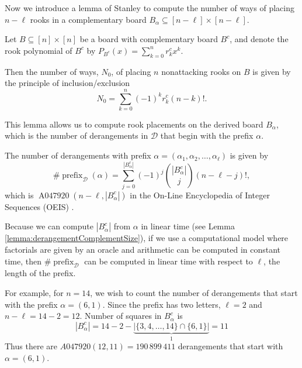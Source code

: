 Now we introduce a lemma of Stanley \cite{Stanley2011EC1} to compute the number
of ways of placing $n - \ell$ rooks in a complementary board
$B_\alpha \subseteq [n - \ell] \times [n - \ell]$.

\begin{lemma}
  Let $B \subseteq [n] \times [n]$ be a board with complementary board $B^c$,
  and denote the rook polynomial of $B^c$ by
  $P_{B^c}(x) = \sum_{k=0}^n r^c_k x^k$.

  Then the number of ways, $N_0$, of placing $n$ nonattacking rooks on $B$
  is given by the principle of inclusion/exclusion
  \[
    N_0 = \sum_{k=0}^n (-1)^k r^c_k (n-k)!.
  \]
  \label{lemma:CountsFromComplementaryPolynomials}
\end{lemma}

This lemma allows us to compute rook placements on the derived board $B_\alpha$,
which is the number of derangements in $\mathcal{D}$ that begin with the prefix
$\alpha$.
\begin{corollary}
  The number of derangements with prefix
  $\alpha = (\alpha_1, \alpha_2, \dots, \alpha_\ell)$
  is given by \[
    \#\operatorname{prefix}_\mathcal{D}(\alpha)
    = \sum_{j=0}^{|B_\alpha^c|} (-1)^j \binom{|B_\alpha^c|}{j}(n-\ell-j)!,
  \] which is $\operatorname{A047920}(n-\ell, |B_\alpha^c|)$ in
  the On-Line Encyclopedia of Integer Sequences (OEIS) \cite{oeis}.
\end{corollary}

Because we can compute $|B_\alpha^c|$ from $\alpha$ in linear time
(see Lemma \ref{lemma:derangementComplementSize}), if we use a computational
model where factorials are given by an oracle and arithmetic can be computed
in constant time, then $\#\operatorname{prefix}_\mathcal{D}$ can be computed
in linear time with respect to $\ell$, the length of the prefix.

\begin{example}
  For example, for $n = 14$, we wish to count the number of derangements that
  start with the prefix $\alpha = (6,1)$.
  Since the prefix has two letters, $\ell = 2$ and $n - \ell = 14 - 2 = 12$.
  Number of squares in $B_\alpha^c$ is \[
    |B_\alpha^c| = 14 - 2 - \underbrace{|\{3,4,\dots,14\} \cap \{6, 1\}|}_1 = 11
  \]
  Thus there are $A047920(12,11) = 190\,899\,411$ derangements that start
  with $\alpha = (6,1)$.
\end{example}


